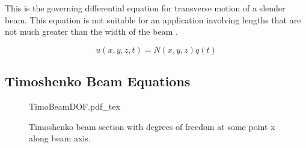 This is the governing differential equation for transverse motion of a slender beam. This equation is not suitable for an application involving lengths that are not much greater than the width of the beam \cite{genta2007dynamics}.

\begin{equation} \label{eq:FEGoverning}
u(x,y,z,t)=N(x,y,z)q(t)
\end{equation}

\subsection{Timoshenko Beam Equations}
\begin{figure}
	\centering
	\def\svgwidth{300pt}
	{TimoBeamDOF.pdf_tex}
	\caption{Timoshenko beam section with degrees of freedom at some point x along beam axis.}
	\label{fig:TimoBeamDOF}
\end{figure}

